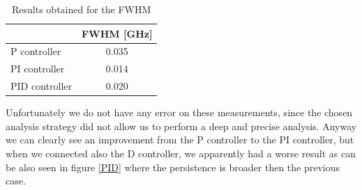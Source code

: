 \documentclass[a4paper,10pt]{article}
\begin{document}
\begin{table}[H]
\centering
\begin{tabular}{l|c}
               & FWHM  {[}GHz{]} \\ \hline
P controller   & 0.035           \\ \hline
PI controller  & 0.014           \\ \hline
PID controller & 0.020           \\ \hline
\end{tabular}
\caption{Results obtained for the FWHM}
\end{table}
Unfortunately we do not have any error on these measurements, since the chosen analysis strategy did not allow us to perform a deep and precise analysis. Anyway we can clearly see an improvement from the P controller to the PI controller, but when we connected also the D controller, we apparently had a worse result as can be also seen in figure \ref{PID} where the persistence is broader then the previous case.
\newline
\end{document}
